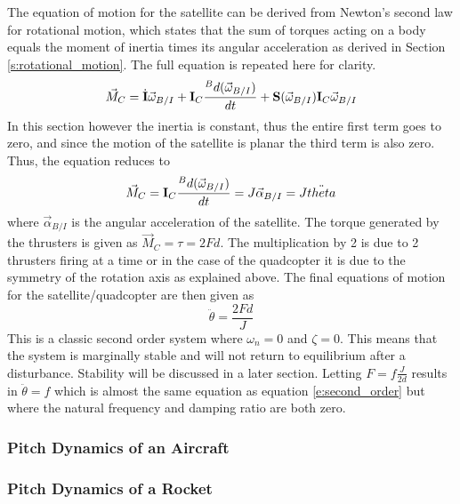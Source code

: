 The equation of motion for the satellite can be derived from Newton's second law for rotational motion, which states that the sum of torques acting on a body equals the moment of inertia times its angular acceleration as derived in Section \ref{s:rotational_motion}. The full equation is repeated here for clarity.
\begin{equation}
\vec{M}_C = \dot{{\bf I}}\vec{\omega}_{B/I} + {\bf I}_C\frac{{}^Bd (\vec{\omega}_{B/I})}{dt} + {\bf
  S}(\vec{\omega}_{B/I}){\bf I}_C\vec{\omega}_{B/I}
\end{equation}
In this section however the inertia is constant, thus the entire first term goes to zero, and since the motion of the satellite is planar the third term is also zero. Thus, the equation reduces to
\begin{equation}
\vec{M}_C = {\bf I}_C\frac{{}^Bd (\vec{\omega}_{B/I})}{dt} = J \vec{\alpha}_{B/I} = J\ddot{theta}
\end{equation}
where $\vec{\alpha}_{B/I}$ is the angular acceleration of the satellite. The torque generated by the thrusters is given as $\vec{M}_C = \tau = 2Fd$. The multiplication by 2 is due to 2 thrusters firing at a time or in the case of the quadcopter it is due to the symmetry of the rotation axis as explained above. The final equations of motion for the satellite/quadcopter are then given as
\begin{equation}
\ddot{\theta} = \frac{2Fd}{J}
\end{equation}
This is a classic second order system where $\omega_n = 0$ and $\zeta = 0$. This means that the system is marginally stable and will not return to equilibrium after a disturbance. Stability will be discussed in a later section. Letting $F=f\frac{J}{2d}$ results in $\ddot{\theta}=f$ which is almost the same equation as equation \ref{e:second_order} but where the natural frequency and damping ratio are both zero. 

\subsubsection{Pitch Dynamics of an Aircraft}

\subsubsection{Pitch Dynamics of a Rocket}

